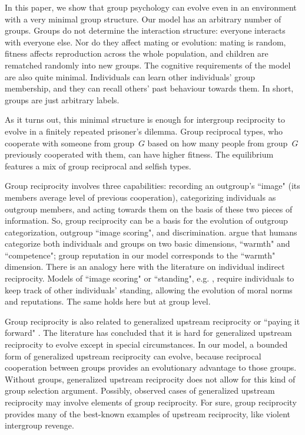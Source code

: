 \documentclass[12pt,a4paper]{article}
\begin{document}
In this paper, we show that group psychology can evolve even in an environment with a very minimal group structure. Our model has an arbitrary number of groups. Groups do not determine the interaction structure: everyone interacts with everyone else. Nor do they affect mating or evolution: mating is random, fitness affects reproduction across the whole population, and children are rematched randomly into new groups. The cognitive requirements of the model are also quite minimal. Individuals can learn other individuals' group membership, and they can recall others' past behaviour towards them. In short, groups are just arbitrary labels.

As it turns out, this minimal structure is enough for intergroup reciprocity to evolve in a finitely repeated prisoner's dilemma. Group reciprocal types, who cooperate with someone from group~$G$ based on how many people from group~$G$ previously cooperated with them, can have higher fitness. The equilibrium features a mix of group reciprocal and selfish types.

Group reciprocity involves three capabilities: recording an outgroup's ``image" (its members average level of previous cooperation), categorizing individuals as outgroup members, and acting towards them on the basis of these two pieces of information. So, group reciprocity can be a basis for the evolution of outgroup categorization, outgroup ``image scoring", and discrimination. \cite{fiske2007universal} argue that humans categorize both individuals and groups on two basic dimensions, ``warmth" and ``competence"; group reputation in our model corresponds to the ``warmth" dimension. There is an analogy here with the literature on individual indirect reciprocity. Models of ``image scoring" or ``standing", e.g. \cite{nowak2005evolution}, require individuals to keep track of other individuals' standing, allowing the evolution of moral norms and reputations. The same holds here but at group level.

Group reciprocity is also related to generalized upstream reciprocity or ``paying it forward" \parencite{boyd1989evolution,nowak2007upstream}. The literature has concluded that it is hard for generalized upstream reciprocity to evolve except in special circumstances. In our model, a bounded form of generalized upstream reciprocity can evolve, because reciprocal cooperation between groups provides an evolutionary advantage to those groups. Without groups, generalized upstream reciprocity does not allow for this kind of group selection argument. Possibly, observed cases of generalized upstream reciprocity \parencite[e.g.][]{mujcic2018indirect,yuan2019gift} may involve elements of group reciprocity. For sure, group reciprocity provides many of the best-known examples of upstream reciprocity, like violent intergroup revenge.
\end{document}
